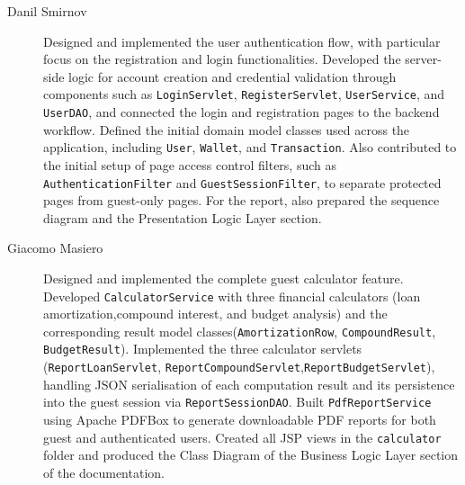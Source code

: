 \begin{description}
	\item[Danil Smirnov] Designed and implemented the user authentication flow, with particular focus on the registration and login functionalities. Developed the server-side logic for account creation and credential validation through components such as \texttt{LoginServlet}, \texttt{RegisterServlet}, \texttt{UserService}, and \texttt{UserDAO}, and connected the login and registration pages to the backend workflow. Defined the initial domain model classes used across the application, including \texttt{User}, \texttt{Wallet}, and \texttt{Transaction}. Also contributed to the initial setup of page access control filters, such as \texttt{AuthenticationFilter} and \texttt{GuestSessionFilter}, to separate protected pages from guest-only pages. For the report, also prepared the sequence diagram and the Presentation Logic Layer section.
	\item[Giacomo Masiero] Designed and implemented the complete guest calculator feature. Developed \texttt{CalculatorService} with three financial calculators (loan amortization,compound interest, and budget analysis) and the corresponding result model classes(\texttt{AmortizationRow}, \texttt{CompoundResult}, \texttt{BudgetResult}). Implemented the three calculator servlets (\texttt{ReportLoanServlet}, \texttt{ReportCompoundServlet},\texttt{ReportBudgetServlet}), handling JSON serialisation of each computation result and its persistence into the guest session via \texttt{ReportSessionDAO}. Built \texttt{PdfReportService} using Apache PDFBox to generate downloadable PDF reports for both guest and authenticated users. Created all JSP views in the \texttt{calculator} folder and produced the Class Diagram of the Business Logic Layer section of the documentation.






\end{description}
